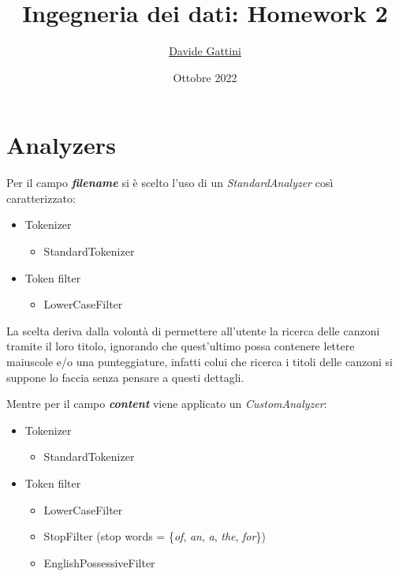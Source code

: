 \documentclass{article}
\title{Ingegneria dei dati: Homework 2}
\author{\faGithub\href{https://github.com/Gatto99/DataEngineering}{Davide Gattini}}
\date{Ottobre 2022}
\begin{document}
\maketitle

\section{Analyzers}
Per il campo \textbf{\textit{filename}} si è scelto l'uso di un \textit{StandardAnalyzer} così caratterizzato:
\begin{itemize}
    \item Tokenizer
    \begin{itemize}
        \item StandardTokenizer
    \end{itemize}
    \item Token filter
    \begin{itemize}
        \item LowerCaseFilter
    \end{itemize}
\end{itemize}

La scelta deriva dalla volontà di permettere all'utente la ricerca delle canzoni tramite il loro titolo, ignorando che quest'ultimo possa contenere lettere maiuscole e/o una punteggiature, infatti colui che ricerca i titoli delle canzoni si suppone lo faccia senza pensare a questi dettagli. 
\iffalse
e qualora non si facessero queste considerazioni, i documenti cui titoli hanno punteggiatura o maiuscole, non verranno trovati dal programma a meno che l'utente non sappia dove esse si trovano. 
\fi

Mentre per il campo \textbf{\textit{content}} viene applicato un \textit{CustomAnalyzer}:
\begin{itemize}
    \item Tokenizer
    \begin{itemize}
        \item StandardTokenizer
    \end{itemize}
    \item Token filter
    \begin{itemize}
        \item LowerCaseFilter
        \item StopFilter (stop words = \{\textit{of}, \textit{an}, \textit{a}, \textit{the}, \textit{for}\})
        \item EnglishPossessiveFilter
    \end{itemize}
\end{itemize}
\end{document}
